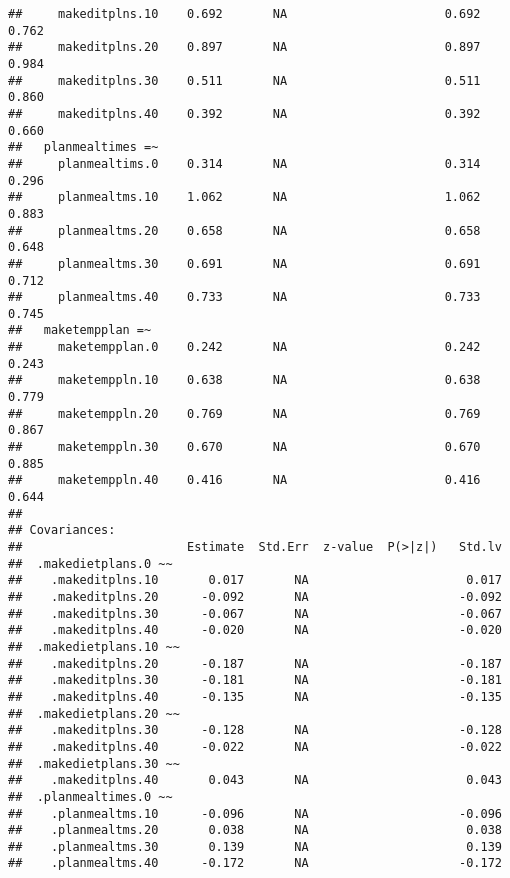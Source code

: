 \documentclass{article}\usepackage[]{graphicx}\usepackage[]{color}
\makeatletter
\newenvironment{kframe}{%
 \def\at@end@of@kframe{}%
 \ifinner\ifhmode%
  \def\at@end@of@kframe{\end{minipage}}%
  \begin{minipage}{\columnwidth}%
 \fi\fi%
 \def\FrameCommand##1{\hskip\@totalleftmargin \hskip-\fboxsep
 \colorbox{shadecolor}{##1}\hskip-\fboxsep
     \hskip-\linewidth \hskip-\@totalleftmargin \hskip\columnwidth}%
 \MakeFramed {\advance\hsize-\width
   \@totalleftmargin\z@ \linewidth\hsize
   \@setminipage}}%
 {\par\unskip\endMakeFramed%
 \at@end@of@kframe}
\newenvironment{knitrout}{}{} %
\makeatother
\begin{document}
\begin{knitrout}
\begin{kframe}
\begin{verbatim}
##     makeditplns.10    0.692       NA                      0.692    0.762
##     makeditplns.20    0.897       NA                      0.897    0.984
##     makeditplns.30    0.511       NA                      0.511    0.860
##     makeditplns.40    0.392       NA                      0.392    0.660
##   planmealtimes =~                                                      
##     planmealtims.0    0.314       NA                      0.314    0.296
##     planmealtms.10    1.062       NA                      1.062    0.883
##     planmealtms.20    0.658       NA                      0.658    0.648
##     planmealtms.30    0.691       NA                      0.691    0.712
##     planmealtms.40    0.733       NA                      0.733    0.745
##   maketempplan =~                                                       
##     maketempplan.0    0.242       NA                      0.242    0.243
##     maketemppln.10    0.638       NA                      0.638    0.779
##     maketemppln.20    0.769       NA                      0.769    0.867
##     maketemppln.30    0.670       NA                      0.670    0.885
##     maketemppln.40    0.416       NA                      0.416    0.644
## 
## Covariances:
##                       Estimate  Std.Err  z-value  P(>|z|)   Std.lv
##  .makedietplans.0 ~~                                              
##    .makeditplns.10       0.017       NA                      0.017
##    .makeditplns.20      -0.092       NA                     -0.092
##    .makeditplns.30      -0.067       NA                     -0.067
##    .makeditplns.40      -0.020       NA                     -0.020
##  .makedietplans.10 ~~                                             
##    .makeditplns.20      -0.187       NA                     -0.187
##    .makeditplns.30      -0.181       NA                     -0.181
##    .makeditplns.40      -0.135       NA                     -0.135
##  .makedietplans.20 ~~                                             
##    .makeditplns.30      -0.128       NA                     -0.128
##    .makeditplns.40      -0.022       NA                     -0.022
##  .makedietplans.30 ~~                                             
##    .makeditplns.40       0.043       NA                      0.043
##  .planmealtimes.0 ~~                                              
##    .planmealtms.10      -0.096       NA                     -0.096
##    .planmealtms.20       0.038       NA                      0.038
##    .planmealtms.30       0.139       NA                      0.139
##    .planmealtms.40      -0.172       NA                     -0.172

\end{verbatim}
\end{kframe}
\end{knitrout}
\end{document}
